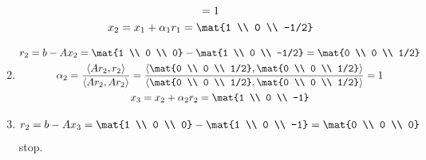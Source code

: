 \documentclass{article}
\begin{document}
\begin{tasks}
\begin{enumerate}[label={(\arabic*)}]
\begin{displaymath}
\begin{gathered}
                    = 1 \\
                    x_2 = x_1 + \alpha_1r_1 = \mat{1 \\ 0 \\ -1/2}
                \end{gathered}
            \end{displaymath}
            \item \begin{displaymath}
                \begin{gathered}
                    r_2 = b - Ax_2 = \mat{1 \\ 0 \\ 0} - \mat{1 \\ 0 \\ -1/2} = \mat{0 \\ 0 \\ 1/2} \\
                    \alpha_2 = \frac{\langle Ar_2, r_2\rangle}{\langle Ar_2, Ar_2 \rangle} 
                    = \frac{\left\langle \mat{0 \\ 0 \\ 1/2}, \mat{0 \\ 0 \\ 1/2}\right\rangle}{\left\langle \mat{0 \\ 0 \\ 1/2}, \mat{0 \\ 0 \\ 1/2}\right\rangle} 
                    = 1 \\
                    x_3 = x_2 + \alpha_2r_2 = \mat{1 \\ 0 \\ -1}
                \end{gathered}
            \end{displaymath}
            \item \begin{displaymath}
                \begin{gathered}
                    r_2 = b - Ax_3 = \mat{1 \\ 0 \\ 0} - \mat{1 \\ 0 \\ -1} = \mat{0 \\ 0 \\ 0} \\
                \end{gathered}
            \end{displaymath}
            stop.
        \end{enumerate}

\end{tasks}
\end{document}
